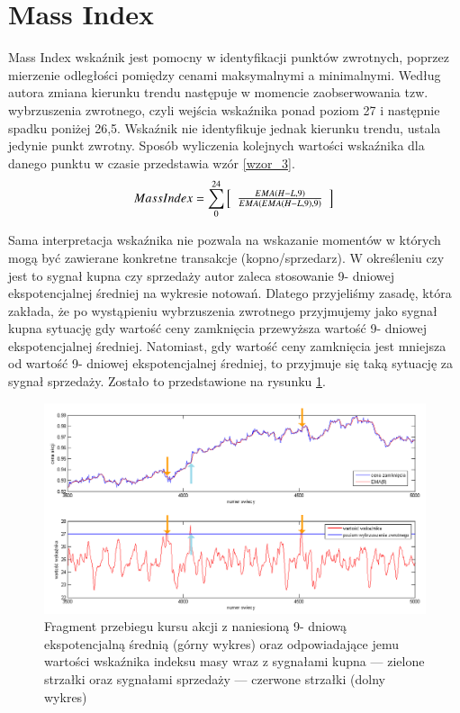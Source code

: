 \section{Mass Index}
\label{sec:1ATR}

Mass Index wskaźnik jest pomocny w identyfikacji punktów zwrotnych, poprzez mierzenie odległości pomiędzy cenami maksymalnymi a minimalnymi. Według autora zmiana kierunku trendu następuje w momencie zaobserwowania tzw. wybrzuszenia zwrotnego, czyli wejścia wskaźnika ponad poziom 27 i następnie spadku poniżej 26,5. Wskaźnik nie identyfikuje jednak kierunku trendu, ustala jedynie punkt zwrotny. Sposób wyliczenia kolejnych wartości wskaźnika dla danego punktu w czasie przedstawia wzór \ref{wzor_3}.
\begin{equation}
Mass Index = \sum_{0}^{24} \left[\begin{array}{c} \frac{ EMA(H - L, 9)}{ EMA(EMA(H-L, 9), 9)}\end{array}\right]\\
\label{wzor_3}
\end{equation}

\noindent Sama interpretacja wskaźnika nie pozwala na wskazanie momentów w których mogą być zawierane konkretne transakcje (kopno/sprzedarz). W określeniu czy jest to sygnał kupna czy sprzedaży autor zaleca stosowanie 9- dniowej ekspotencjalnej średniej na wykresie notowań. Dlatego przyjeliśmy zasadę, która zakłada, że po wystąpieniu wybrzuszenia zwrotnego przyjmujemy jako sygnał kupna sytuację gdy wartość ceny zamknięcia przewyższa wartość 9- dniowej ekspotencjalnej średniej. Natomiast, gdy wartość ceny zamknięcia jest mniejsza od wartość 9- dniowej ekspotencjalnej średniej, to przyjmuje się taką sytuację za sygnał sprzedaży. Zostało to przedstawione na rysunku \ref{kupsprz2}. \\
\begin{figure}[h!]
\centering
\includegraphics[width = \textwidth]{mi2.png}
\caption{Fragment przebiegu kursu akcji z naniesioną  9- dniową ekspotencjalną średnią (górny wykres) oraz odpowiadające jemu wartości wskaźnika indeksu masy wraz z sygnałami kupna --- zielone strzałki oraz sygnałami sprzedaży --- czerwone strzałki (dolny wykres)}
\label{kupsprz2}
\end{figure}
\FloatBarrier

